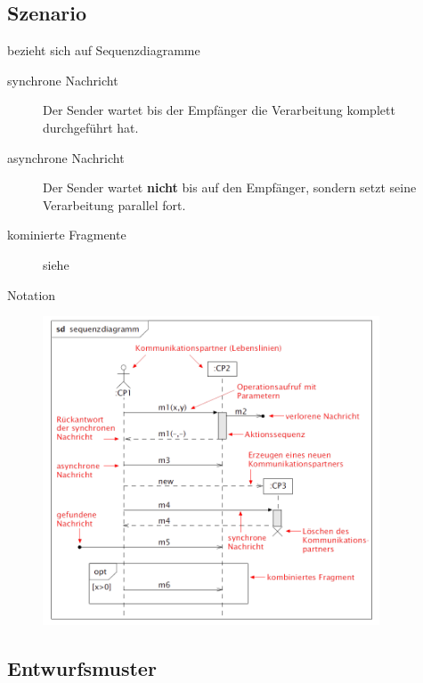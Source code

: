 \subsection{Szenario }
  bezieht sich auf Sequenzdiagramme
  \begin{description}
    \item[synchrone Nachricht]
      Der Sender wartet bis der Empfänger die Verarbeitung komplett durchgeführt hat.
    \item[asynchrone Nachricht]
      Der Sender wartet \textbf{nicht} bis auf den Empfänger, sondern setzt seine Verarbeitung
      parallel fort.
    \item[kominierte Fragmente]
      siehe 
    \item[Notation]
      \parbox{15cm}{\includegraphics[width=10cm]{./bilder/Notation_Sequanzdia.png}}
  \end{description}
  
\subsection{Entwurfsmuster }